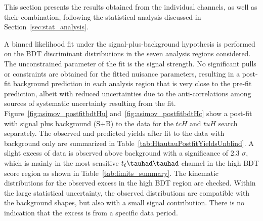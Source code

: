 \documentclass[PAPER, coverpage, atlasdraft=true, texlive=2016, UKenglish]{\ATLASLATEXPATH atlasdoc}
\begin{document}
This section presents the results obtained from the individual channels, as well as their combination,
following the statistical analysis discussed in Section~\ref{sec:stat_analysis}.

A binned likelihood fit under the signal-plus-background hypothesis is performed on the BDT discriminant distributions in the seven 
analysis regions considered. The unconstrained parameter of the fit is the signal strength.
No significant pulls or constraints are obtained for the fitted nuisance parameters, resulting in a post-fit background prediction in each analysis region that is
very close to the pre-fit prediction, albeit with reduced uncertainties due to the anti-correlations among sources of systematic uncertainty resulting from the fit.
Figure~\ref{fig:asimov_postfitbdtHu} and~\ref{fig:asimov_postfitbdtHc} show a post-fit with signal plus background (S+B) to the data for
the $tcH$ and $tuH$ search separately.
The observed and predicted yields after fit to the data with background only are summarized in Table~\ref{tab:HtautauPostfitYieldsUnblind}.
A slight excess of data is observed above background with a significance of 2.3 $\sigma$, which is mainly in the most sensitive $t_{\ell}\thadhad$ channel in the high BDT score region as shown in
Table~\ref{tab:limits_summary}.
The kinematic distributions for the observed excess in
the high BDT region are checked. Within the large statistical uncertainty, the observed distributions are compatible with the background shapes, but also with a small signal contribution. There is no indication that the excess is from a specific data period.
\end{document}
